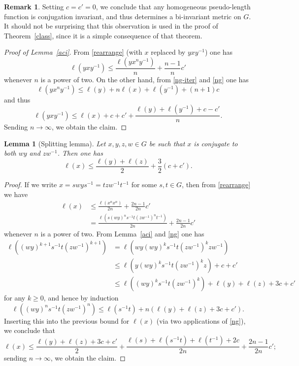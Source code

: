 \documentclass[11pt,a4paper,reqno]{amsart}
\numberwithin{equation}{section}
\theoremstyle{plain}
\newtheorem{lemma}[equation]{Lemma}
\theoremstyle{definition}
\newtheorem{remark}[equation]{Remark}
\newcommand\norm[1]{\ell({#1})}   %
\begin{document}
\begin{remark}\label{Rinv}
Setting $c=c'=0$, we conclude that any homogeneous pseudo-length function
is conjugation invariant, and thus determines a bi-invariant metric on
$G$. It should not be surprising that this observation is used in the
proof of Theorem~\ref{class}, since it is a simple consequence of that
theorem.
\end{remark}

\begin{proof}[Proof of Lemma~\ref{aci}]
From \eqref{rearrange} (with $x$ replaced by $yxy^{-1}$) one has
\[
\norm{yxy^{-1}} \leq \frac{\norm{y x^n y^{-1}} }{n} + \frac{n-1}{n} c'
\]
whenever $n$ is a power of two.  On the other hand, from \eqref{ng-iter}
and \eqref{ng} one has
\[
\norm{ y x^n y^{-1} } \leq \norm{y} + n \norm{x} + \norm{y^{-1}} + (n+1) c
\]
and thus
\[
\norm{yxy^{-1}} \leq \norm{x} + c + c' + \frac{\norm{y} + \norm{y^{-1}} +
c - c'}{n}.
\]
Sending $n \to \infty$, we obtain the claim.
\end{proof}


\begin{lemma}[Splitting lemma]\label{split}
Let $x,y,z,w \in G$ be such that $x$ is conjugate to both $wy$ and
$zw^{-1}$.  Then one has
\begin{equation}\label{ineq}
\norm{x} \leq \frac{\norm{y} + \norm{ z } }{2}  + \frac{3}{2} (c + c').
\end{equation}
\end{lemma}

\begin{proof}
If we write $x = swys^{-1} = t zw^{-1} t^{-1}$ for some $s,t \in G$, then
from \eqref{rearrange} we have
\begin{align*}
 \norm{x} &\leq \frac{\norm{ x^n x^n } }{2n} + \frac{2n-1}{2n} c' \\
&= \frac{\norm{ s(wy)^n s^{-1}t (zw^{-1})^n t^{-1} } }{2n} +
 \frac{2n-1}{2n} c'
\end{align*}
whenever $n$ is a power of two.  From Lemma~\ref{aci} and \eqref{ng} one
has
\begin{align*}
\norm{(wy)^{k+1} s^{-1}t (zw^{-1})^{k+1} } &= \norm{ w y (wy)^k s^{-1} t
(zw^{-1})^k z w^{-1} } \\
&\leq \norm{ y (wy)^k s^{-1} t (zw^{-1})^k z } + c + c' \\
&\leq \norm{ (wy)^k s^{-1} t (zw^{-1})^k } + \norm{y} + \norm{z} + 3c +
c'
\end{align*}
for any $k \geq 0$, and hence by induction
\[
\norm{(wy)^n s^{-1}t (zw^{-1})^n } \leq \norm{s^{-1} t} + n ( \norm{y} +
\norm{z} + 3c + c' ).
\]
Inserting this into the previous bound for $\norm{x}$ (via two
applications of \eqref{ng}), we conclude that
\[
\norm{x} \leq \frac{\norm{y} + \norm{z}+ 3c + c' }{2} + \frac{\norm{s} +
\norm{s^{-1}t} + \norm{t^{-1}} + 2c}{2n} + \frac{2n-1}{2n} c';
\]
sending $n \to \infty$, we obtain the claim.
\end{proof}
\end{document}
